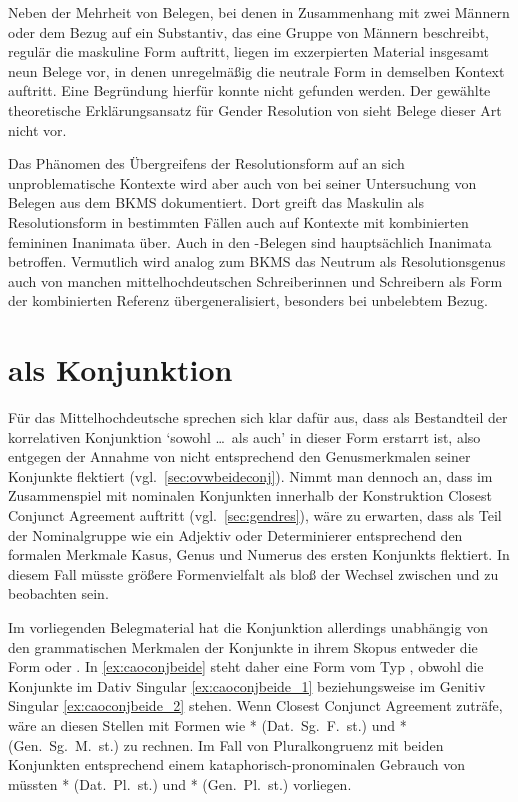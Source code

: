 Neben der Mehrheit von Belegen, bei denen in Zusammenhang mit zwei Männern oder
dem Bezug auf ein Substantiv, das eine Gruppe von Männern beschreibt, regulär
die maskuline Form  auftritt, liegen im exzerpierten Material
insgesamt neun Belege vor, in denen unregelmäßig die neutrale Form
 in demselben Kontext auftritt. Eine Begründung hierfür konnte
nicht gefunden werden. Der gewählte theoretische Erklärungsansatz für Gender
Resolution von \citet{wechslerzlatic2003,wechsler2009} sieht Belege dieser Art
nicht vor.

Das Phänomen des Übergreifens der Resolutionsform auf an sich unproblematische
Kontexte wird aber auch von \citet[302]{corbett1991} bei seiner Untersuchung
von Belegen aus dem BKMS dokumentiert. Dort greift das Maskulin als
Resolutionsform in bestimmten Fällen auch auf Kon\-texte mit kombinierten
femininen Inanimata über. Auch in den \CAO{}-Belegen sind
hauptsächlich Inanimata betroffen. Vermutlich wird analog zum BKMS das Neutrum
als Resolutionsgenus auch von manchen mittelhochdeutschen Schreiberinnen und
Schreibern als Form der kombinierten Referenz übergeneralisiert, besonders bei
unbelebtem Bezug.


\section{ als Konjunktion}
\label{sec:beideconj}

Für das Mittelhochdeutsche sprechen sich \citet[626--627]{ksw2} klar dafür aus,
dass  als Bestandteil der korrelativen Konjunktion  `sowohl \dots\ als auch' in dieser Form erstarrt ist, also
 entgegen der Annahme von \citet{askedal1974} nicht entsprechend
den Genusmerkmalen seiner Konjunkte flektiert (vgl.~\cref{sec:ovwbeideconj}).
Nimmt man dennoch an, dass im Zusammenspiel mit nominalen Konjunkten innerhalb
der Konstruktion Closest Conjunct Agreement auftritt (vgl.~\cref{sec:gendres}),
wäre zu erwarten, dass  als Teil der Nominalgruppe wie ein Adjektiv
oder Determinierer entsprechend den formalen Merkmale Kasus, Genus und Numerus
des ersten Konjunkts flektiert. In diesem Fall müsste größere Formenvielfalt
als bloß der Wechsel zwischen  und  zu beobachten
sein.

Im vorliegenden Belegmaterial hat die Konjunktion allerdings unabhängig von den
grammatischen Merkmalen der Konjunkte in ihrem Skopus entweder die Form
 oder . In \cref{ex:caoconjbeide} steht daher eine
Form vom Typ , obwohl die Konjunkte im Dativ Singular
\cref{ex:caoconjbeide_1} beziehungsweise im Genitiv Singular
\cref{ex:caoconjbeide_2} stehen. Wenn Closest Conjunct Agreement zuträfe, wäre
an diesen Stellen mit Formen wie * (Dat.~Sg.~F.~st.) und
* (Gen.~Sg.~M.~st.) zu rechnen. Im Fall von Pluralkongruenz mit
beiden Konjunkten entsprechend einem kataphorisch-pronominalen Gebrauch von
 müssten * (Dat.~Pl.~st.) und *
(Gen.~Pl.~st.) vorliegen.

